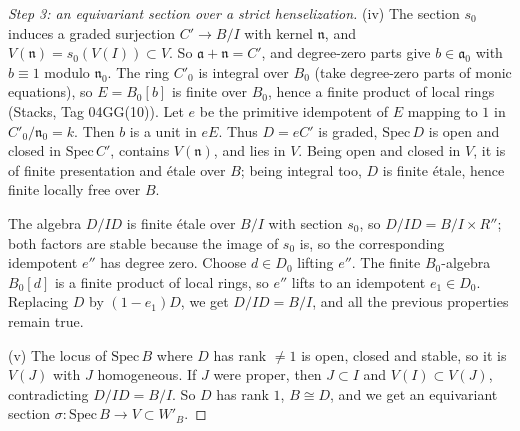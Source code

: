 \begin{proof}[Step 3: an equivariant section over a strict henselization]
(iv) The section $s_0$ induces a graded surjection $C'\to B/I$ with kernel $\mathfrak{n}$, and $V(\mathfrak{n})=s_0(V(I))\subset V$. So $\mathfrak{a}+\mathfrak{n}=C'$, and degree-zero parts give $b\in\mathfrak{a}_0$ with $b\equiv1$ modulo $\mathfrak{n}_0$. The ring $C'_0$ is integral over $B_0$ (take degree-zero parts of monic equations), so $E=B_0[b]$ is finite over $B_0$, hence a finite product of local rings (Stacks, Tag 04GG(10)). Let $e$ be the primitive idempotent of $E$ mapping to $1$ in $C'_0/\mathfrak{n}_0=k$. Then $b$ is a unit in $eE$. Thus $D=eC'$ is graded, $\mathrm{Spec}\,D$ is open and closed in $\mathrm{Spec}\,C'$, contains $V(\mathfrak{n})$, and lies in $V$. Being open and closed in $V$, it is of finite presentation and étale over $B$; being integral too, $D$ is finite étale, hence finite locally free over $B$.

The algebra $D/ID$ is finite étale over $B/I$ with section $s_0$, so $D/ID=B/I\times R''$; both factors are stable because the image of $s_0$ is, so the corresponding idempotent $e''$ has degree zero. Choose $d\in D_0$ lifting $e''$. The finite $B_0$-algebra $B_0[d]$ is a finite product of local rings, so $e''$ lifts to an idempotent $e_1\in D_0$. Replacing $D$ by $(1-e_1)D$, we get $D/ID=B/I$, and all the previous properties remain true.

(v) The locus of $\mathrm{Spec}\,B$ where $D$ has rank $\neq1$ is open, closed and stable, so it is $V(J)$ with $J$ homogeneous. If $J$ were proper, then $J\subset I$ and $V(I)\subset V(J)$, contradicting $D/ID=B/I$. So $D$ has rank $1$, $B\cong D$, and we get an equivariant section $\sigma\colon\mathrm{Spec}\,B\to V\subset W'_B$.
\end{proof}

